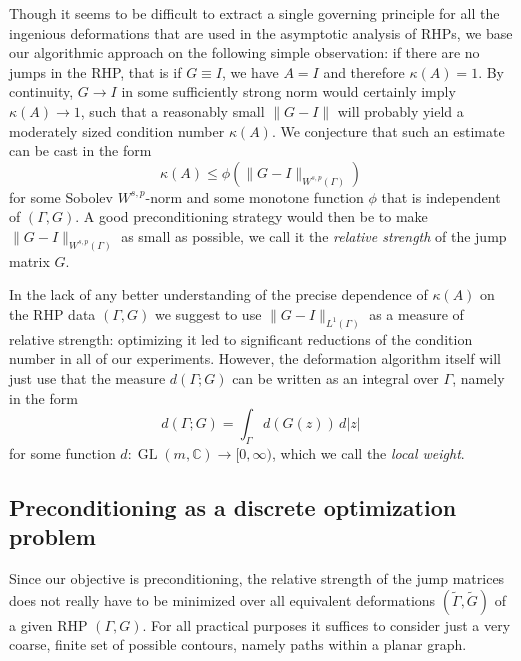 \documentclass[reqno]{amsart}
\renewcommand{\leq}{\leqslant}
\newcommand{\C}{\mathbb{C}}
\DeclareMathOperator*{\GL}{GL}
\begin{document}
Though it seems to be difficult to extract a single governing principle for all the ingenious deformations
that are used in the asymptotic analysis of RHPs, we base our algorithmic approach on the following simple
observation: if there are no jumps in the RHP, that is if $G\equiv I$, we have $A=I$ and therefore $\kappa(A)=1$.
By continuity, $G \to I$ in some sufficiently strong norm would certainly imply $\kappa(A)\to 1$, such that a
reasonably small $\|G-I\|$ will probably yield a moderately sized condition number $\kappa(A)$. 
We conjecture that such an estimate can be cast in the form
\[
\kappa(A) \leq \phi(\|G-I\|_{W^{s,p}(\Gamma)})
\]
for some Sobolev $W^{s,p}$-norm and some monotone function $\phi$ that is independent of $(\Gamma,G)$. A good
preconditioning strategy would then be to make $\|G-I\|_{W^{s,p}(\Gamma)}$ as small as possible, we call it the
{\em relative strength} of the jump matrix $G$.
  
In the lack of any better understanding of the precise dependence of $\kappa(A)$ on the RHP data $(\Gamma,G)$ we
suggest to use $\|G-I\|_{L^1(\Gamma)}$ as a measure of relative strength: optimizing it led to significant reductions of the
condition number in all of our experiments. However, the deformation algorithm itself will just use that the
measure $d(\Gamma;G)$ can be written as an integral over $\Gamma$, namely in the form
\[
d(\Gamma;G) = \int_\Gamma d(G(z))\, d|z|
\] 
for some function $d: \GL(m,\C) \to [0,\infty)$, which we call the \emph{local weight}. 
 
\subsection*{Preconditioning as a discrete optimization problem}

Since our objective is preconditioning, the relative strength of the jump matrices does not really have to be 
minimized over all equivalent deformations $(\tilde\Gamma,\tilde G)$ of a given RHP $(\Gamma,G)$. For all practical purposes
it suffices to consider just a very coarse, finite set of possible contours, namely paths within a 
planar graph. 
\end{document}
